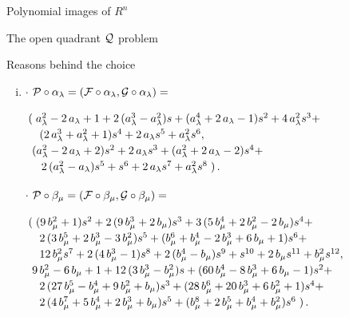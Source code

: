 \documentclass[11pt, a4paper, english, twoside, notitlepage]{report}
\begin{document}
\begin{chapter}{Polynomial images of $R^n$}
\begin{section}{The open quadrant $\mathcal{Q}$ problem}
\begin{subsection}{Reasons behind the choice}
\begin{enumerate}[(i)]
			\item $\cdot$ $\mathcal{P}\circ\alpha_{\lambda}=(\mathcal{F}\circ\alpha_{\lambda },\mathcal{G}\circ\alpha_{\lambda})=$
			
				$\arraycolsep=2pt\def\arraystretch{1.2}
				\begin{array}{l}
					\left(\right.a_{\lambda}^{2}-2 \, a_{\lambda}+1+2 \, {(a_{\lambda}^{3} - a_{\lambda}^{2})} s+{(a_{\lambda}^{4} + 2 \, a_{\lambda} - 1)} s^{2}+4 \, a_{\lambda}^{2} s^{3}+\\
					\quad {(2 \, a_{\lambda}^{3} + a_{\lambda}^{2} + 1)} s^{4}+2 \, a_{\lambda} s^{5}+a_{\lambda}^{2} s^{6},	\\		
					\ {(a_{\lambda}^{2} - 2 \, a_{\lambda} + 2)} s^{2}+2 \, a_{\lambda} s^{3}+{(a_{\lambda}^{2} + 2 \, a_{\lambda} - 2)} s^{4} + \\
					\quad \, 2 \, {(a_{\lambda}^{2} - a_{\lambda})} s^{5}+s^{6}+2 \, a_{\lambda} s^{7}+a_{\lambda}^{2} s^{8}\left.\right).
				\end{array}
				$
				
				$\cdot$ $\mathcal{P}\circ\beta_{\mu}=(\mathcal{F}\circ\beta_{\mu},\mathcal{G}\circ\beta_{\mu})=$
				
				$\arraycolsep=2pt\def\arraystretch{1.2}
				\begin{array}{l}
					\left(\right.{(9 \, b_{\mu}^{2} + 1)} s^{2}+2 \, {(9 \, b_{\mu}^{3} + 2 \,b_{\mu})} s^{3}+3 \, {(5 \, b_{\mu}^{4} + 2 \, b_{\mu}^{2} - 2 \, b_{\mu})}s^{4}+\\
					\quad 2 \, {(3 \, b_{\mu}^{5} + 2 \, b_{\mu}^{3} - 3 \, b_{\mu}^{2})}s^{5}+{(b_{\mu}^{6} + b_{\mu}^{4} - 2 \, b_{\mu}^{3} + 6 \, b_{\mu} + 1)} s^{6}+\\
					\quad 12 \,b_{\mu}^{2} s^{7}+2 \, {(4 \, b_{\mu}^{3} - 1)} s^{8}+2 \, {(b_{\mu}^{4} -b_{\mu})} s^{9} + s^{10} + 2 \, b_{\mu} s^{11}+b_{\mu}^{2} s^{12},\\
					\ 9 \, b_{\mu}^{2}-6 \, b_{\mu}+1+12 \, {(3 \, b_{\mu}^{3} - b_{\mu}^{2})} s+{(60\, b_{\mu}^{4} - 8 \, b_{\mu}^{3} + 6 \, b_{\mu} - 1)} s^{2} + \\
					\quad 2 \, {(27 \, b_{\mu}^{5}- b_{\mu}^{4} + 9 \, b_{\mu}^{2} + b_{\mu})} s^{3}+{(28 \, b_{\mu}^{6} + 20 \, b_{\mu}^{3}+ 6 \, b_{\mu}^{2} + 1)} s^{4}+\\
					\quad 2 \, {(4 \, b_{\mu}^{7} + 5 \, b_{\mu}^{4} + 2\, b_{\mu}^{3} + b_{\mu})} s^{5}+{(b_{\mu}^{8} + 2 \, b_{\mu}^{5} + b_{\mu}^{4} +b_{\mu}^{2})} s^{6}\left.\right).
					\end{array}
				$
					
		\end{enumerate}
		

\end{subsection}
\end{section}
\end{chapter}
\end{document}
